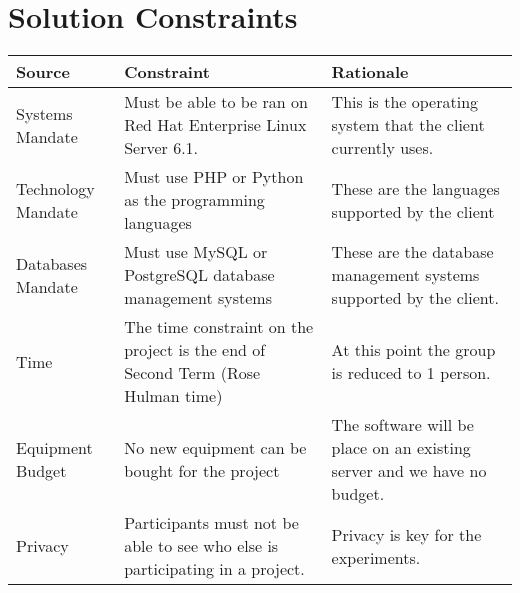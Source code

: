 \section{Solution Constraints}
\begin{table}[!h]
    \begin{tabular}{|l|p{5.5cm}|p{5.5cm}|}
        \hline
        Source & Constraint & Rationale \\
        \hline
        Systems Mandate & Must be able to be ran on Red Hat Enterprise Linux Server 6.1. & This is the operating system that the client currently uses. \\
        \hline
        Technology Mandate & Must use PHP or Python as the programming languages & These are the languages supported by the client \\
        \hline
        Databases Mandate & Must use MySQL or PostgreSQL database management systems & These are the database management systems supported by the client. \\
        \hline
        Time  & The time constraint on the project is the end of Second Term (Rose Hulman time) & At this point the group is reduced to 1 person. \\
        \hline
        Equipment Budget & No new equipment can be bought for the project & The software will be place on an existing server and we have no budget. \\
        \hline
        Privacy & Participants must not be able to see who else is participating in a project. & Privacy is key for the experiments. \\
        \hline
    \end{tabular}
\end{table}

